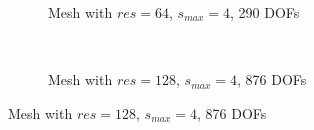 \begin{figure}[H]
    \begin{subfigure}[b]{1\linewidth}
        \centering
        \caption{Mesh with $res=64$, $s_{max}=4$, 290 DOFs}
    \end{subfigure}
    \\
    \begin{subfigure}[b]{1\linewidth}
        \centering
        \caption{Mesh with $res=128$, $s_{max}=4$, 876 DOFs}
    \end{subfigure}
\end{figure}

